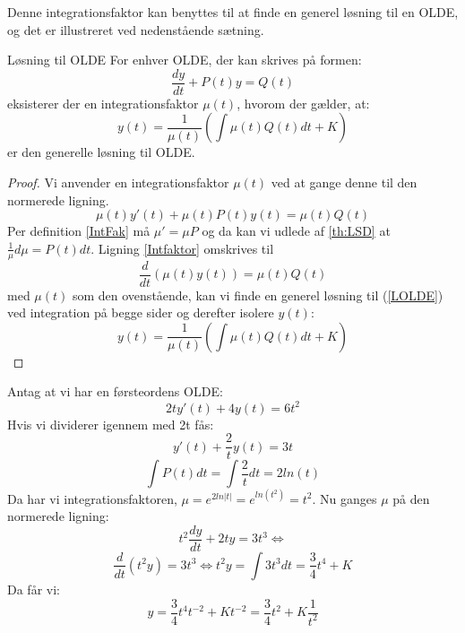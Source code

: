 Denne integrationsfaktor kan benyttes til at finde en generel løsning til en OLDE, og det er illustreret ved nedenstående sætning.

\begin{mytheo}{Løsning til OLDE}{}
For enhver OLDE, der kan skrives på formen:
\begin{equation}\label{LOLDE}
\frac{dy}{dt}+P(t)y=Q(t)
\end{equation}
eksisterer der en integrationsfaktor $\mu(t)$, hvorom der gælder, at: $$y(t)=\frac{1}{\mu (t)}(\int \mu (t)Q(t)dt+K)$$ er den generelle løsning til OLDE.
\end{mytheo}

\begin{proof}
Vi anvender en integrationsfaktor $\mu(t)$ ved at gange denne til den normerede ligning.
\begin{equation}\label{Intfaktor}
\mu (t)y'(t) + \mu (t)P(t)y(t) = \mu (t)Q(t) 
\end{equation}
Per definition \ref{IntFak} må $\mu ' = \mu P$ og da kan vi udlede af \ref{th:LSD} at $\frac{1}{\mu}d\mu = P(t)dt$.
Ligning \eqref{Intfaktor} omskrives til $$\frac{d}{dt}(\mu (t)y(t)) = \mu (t)Q(t)$$ 
med $\mu (t)$ som den ovenstående, kan vi finde en generel løsning til (\ref{LOLDE}) ved integration på begge sider og derefter isolere $y(t)$:
\begin{equation}
y(t)=\frac{1}{\mu (t)}(\int \mu (t)Q(t)dt+K)
\end{equation}
\end{proof}

\begin{Example}
\textnormal{Antag at vi har en førsteordens OLDE:}
$$2ty'(t) + 4y(t) = 6t^2$$
\textnormal{Hvis vi dividerer igennem med 2t fås:}
$$y'(t) + \frac{2}{t}y(t) = 3t$$
$$\int P(t)dt = \int \frac{2}{t}dt = 2ln(t)$$
\textnormal{Da har vi integrationsfaktoren,} $\mu = e^{2ln|t|} = e^{ln(t^2)} = t^2$. \textnormal{Nu ganges $\mu$ på den normerede ligning:}
$$t^2 \frac{dy}{dt} + 2ty = 3t^3\Leftrightarrow$$
$$\frac{d}{dt}(t^2y) = 3t^3 \Leftrightarrow  t^2y = \int 3t^3dt = \frac{3}{4}t^4 + K$$
\textnormal{Da får vi:} 
$$y = \frac{3}{4}t^4t^{-2} + Kt^{-2} = \frac{3}{4}t^2 + K \frac{1}{t^2}$$
\end{Example}

